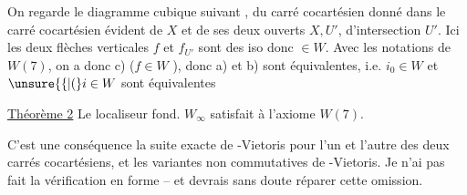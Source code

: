 On regarde le diagramme cubique suivant
, du carré cocartésien donné dans le carré cocartésien
évident de $X$ et de ses deux ouverts $X,U'$,
d'intersection $U'$. Ici les deux flèches verticales
$f$ et $f_{U'}$ sont des iso donc  $\in W$. Avec les
notations de $W(7)$, on a donc c) ($f\in W$ \unsure{!}),
donc a) et b) sont équivalentes, i.e. $i_0\in W$
et $\unsure{\{|(}i\in W$ sont équivalentes \hfill {}

\uline{Théorème 2} Le localiseur fond. $W_{\infty}$ satisfait à
l'axiome $W(7)$.

C'est  une conséquence   la suite exacte
de -Vietoris pour l'un  et l'autre
des deux carrés cocartésiens, et les variantes
non commutatives de -Vietoris. Je n'ai
pas fait la vérification en forme -- et devrais
sans doute réparer cette omission.
